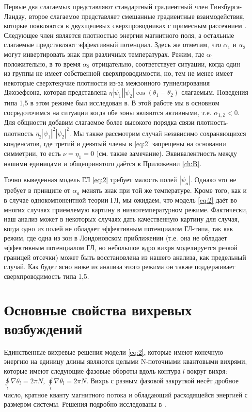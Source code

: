Первые два слагаемых представляют стандартный градиентный член 
Гинзбурга-Ландау, второе слагаемое представляет смешанные градиентные 
взаимодействия, которые появляются в двухщелевых сверхпроводниках с примесным 
рассеянием \cite{bib:8,bib:9}. Следующее член является плотностью энергии 
магнитного поля, а остальные слагаемые представляют эффективный потенциал. 
Здесь же отметим, что \( \alpha_1 \) и \( \alpha_2 \) могут инвертировать знак 
при различных температурах. Режим, где \( \alpha_1 \) положительно, в то время 
\( \alpha_2 \) отрицательно, соответствует ситуации, когда один из группы 
не имеет собственной сверхпроводимости, но, тем не менее имеет некоторые 
сверхтекучие плотности из-за межзонного туннелирования Джозефсона, которая 
представлена \( \eta|\psi_1||\psi_2|\cos(\theta_1-\theta_2) \) слагаемым. 
Поведения типа 1,5 в этом режиме был исследован в\cite{bib:2}. В этой работе 
мы в основном сосредоточимся на ситуации когда обе зоны являются активными, 
т.е. \( \alpha_{1,2} < 0 \). Для общности добавим слагаемое более высокого 
порядка связи плотность-плотность \( \eta_2|\psi_1|^2|\psi_2|^2 \). Мы также 
рассмотрим случай независимо сохраняющихся конденсатов, где третий и девятый 
члены в \eqref{eq:2} запрещены на основании симметрии, то есть 
\( \nu = \eta_1 = 0 \) (см. также замечание\cite{bib:21}). Эквивалентность 
между нашими единицами и общепринятого даётся в Приложении \ref{ch:B}.

Точно выведенная модель ГЛ \eqref{eq:2} требует малость полей \( |\psi_a| \). 
Однако это не требует в принципе от \( \alpha_a \) менять знак при той же 
температуре. Кроме того, как и в случае однокомпонентной теории ГЛ, мы 
ожидаем, что модель \eqref{eq:2} даёт во многих случаях приемлемую картину 
в низкотемпературном режиме. Фактически, наш анализ может в некоторых случаях 
дать качественную картину для случая, когда одно из полей не обладает 
эффективным потенциалом ГЛ-типа, так как режим, где одна из зон в Лондоновском 
приближении (т.е. она не обладает эффективным потенциалом ГЛ, но небольшое ядро 
вихря моделируется резкой границей отсечки) может быть восстановлена из 
нашего анализа, как предельный случай. Как будет ясно ниже из анализа этого 
режима он также поддерживает сверхпроводимость типа 1,5.

\section{Основные свойства вихревых возбуждений}

Единственные вихревые решения модели \eqref{eq:2}, которые имеют конечную 
энергию на единицу длины являются целыми N-поточными квантовыми вихрями, 
которые имеют следующие фазовые обороты вдоль контура \( l \) вокруг вихря: 
\( \oint\limits_l \nabla\theta_l = 2\pi N \), 
\( \oint\limits_l \nabla\theta_l = 2\pi N \). Вихрь с разным фазовой закруткой 
несёт дробное число, кратное кванту магнитного потока и обладающий
расходящейся энергией с размером системы. Решения подробно исследованы в
\cite{bib:22}.


